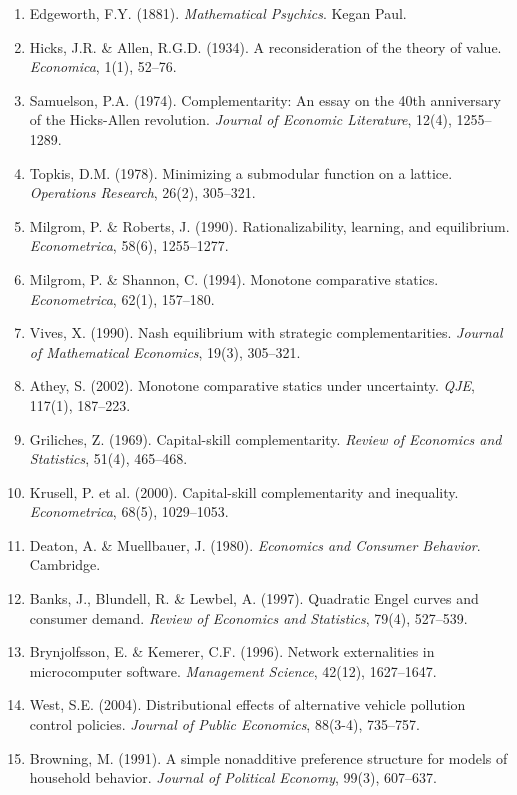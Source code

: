 \begin{enumerate}
    \item Edgeworth, F.Y. (1881). \textit{Mathematical Psychics}. Kegan Paul.
    \item Hicks, J.R. \& Allen, R.G.D. (1934). A reconsideration of the theory of value. \textit{Economica}, 1(1), 52--76.
    \item Samuelson, P.A. (1974). Complementarity: An essay on the 40th anniversary of the Hicks-Allen revolution. \textit{Journal of Economic Literature}, 12(4), 1255--1289.
    \item Topkis, D.M. (1978). Minimizing a submodular function on a lattice. \textit{Operations Research}, 26(2), 305--321.
    \item Milgrom, P. \& Roberts, J. (1990). Rationalizability, learning, and equilibrium. \textit{Econometrica}, 58(6), 1255--1277.
    \item Milgrom, P. \& Shannon, C. (1994). Monotone comparative statics. \textit{Econometrica}, 62(1), 157--180.
    \item Vives, X. (1990). Nash equilibrium with strategic complementarities. \textit{Journal of Mathematical Economics}, 19(3), 305--321.
    \item Athey, S. (2002). Monotone comparative statics under uncertainty. \textit{QJE}, 117(1), 187--223.
    \item Griliches, Z. (1969). Capital-skill complementarity. \textit{Review of Economics and Statistics}, 51(4), 465--468.
    \item Krusell, P. et al. (2000). Capital-skill complementarity and inequality. \textit{Econometrica}, 68(5), 1029--1053.
    \item Deaton, A. \& Muellbauer, J. (1980). \textit{Economics and Consumer Behavior}. Cambridge.
    \item Banks, J., Blundell, R. \& Lewbel, A. (1997). Quadratic Engel curves and consumer demand. \textit{Review of Economics and Statistics}, 79(4), 527--539.
    \item Brynjolfsson, E. \& Kemerer, C.F. (1996). Network externalities in microcomputer software. \textit{Management Science}, 42(12), 1627--1647.
    \item West, S.E. (2004). Distributional effects of alternative vehicle pollution control policies. \textit{Journal of Public Economics}, 88(3-4), 735--757.
    \item Browning, M. (1991). A simple nonadditive preference structure for models of household behavior. \textit{Journal of Political Economy}, 99(3), 607--637.

\end{enumerate}
